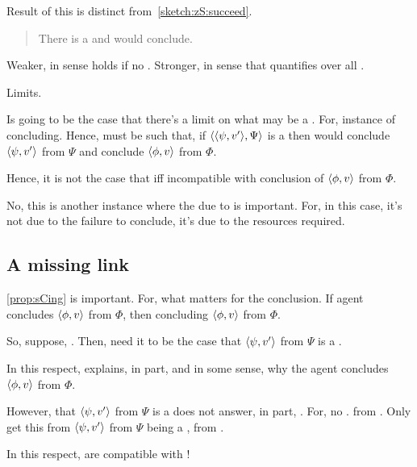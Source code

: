 \begin{note}
  Result of this is distinct from~\autoref{sketch:zS:succeed}.

  \begin{quote}
    There is a \curb{} and would conclude.
  \end{quote}

  Weaker, in sense holds if no \curb{}.
  Stronger, in sense that quantifies over all \curb{}.
\end{note}


\begin{note}
  Limits.

  Is going to be the case that there's a limit on what may be a \curb{}.
  For, instance of concluding.
  Hence, must be such that, if \(\langle \langle \psi, v' \rangle, \Psi \rangle\) is a \curb{} then would conclude \(\langle \psi, v' \rangle\) from \(\Psi\) and conclude \(\langle \phi, v \rangle\) from \(\Phi\).

  Hence, it is not the case that \curb{} iff incompatible with conclusion of \(\langle \phi, v \rangle\) from \(\Phi\).

  No, this is another instance where the due to is important.
  For, in this case, it's not due to the failure to conclude, it's due to the resources required.
\end{note}




\newpage

\subsection{A missing link}
\label{cha:zS:sec:missing-link}

\begin{note}
  \autoref{prop:sCing} is important.
  For, what matters for the conclusion.
  If agent concludes \(\langle \phi, v \rangle\) from \(\Phi\), then concluding \(\langle \phi, v \rangle\) from \(\Phi\).

  So, suppose, \curb{}.
  Then, need it to be the case that \(\langle \psi, v' \rangle\) from \(\Psi\) is a \fc{}.

  In this respect, \fc{} explains, in part, and in some sense, why the agent concludes \(\langle \phi, v \rangle\) from \(\Phi\).

  However, that \(\langle \psi, v' \rangle\) from \(\Psi\) is a \fc{} does not answer, in part, \qWhyVoP{}.
  For, no \ros{}.
  \ros{} from \agpe{}.
  Only get this from \(\langle \psi, v' \rangle\) from \(\Psi\) being a \fc{}, from \agpe{}.

  In this respect,  are compatible with \issueConstraint{}!
\end{note}

